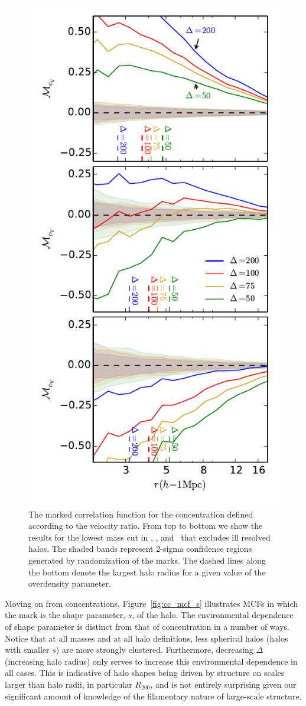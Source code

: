 \documentclass[usenatbib,usegraphicx,letterpaper]{mn2e}
\begin{document}
\begin{figure}
	\centering
	\includegraphics[width=.4\textwidth]{all_mcf_cV_z00_cutcomp.pdf}
	\caption{The marked correlation function for the concentration defined according to the velocity ratio. From top to bottom we show the results for the lowest mass cut in \simA, \simB, and \simC \ that excludes ill resolved halos. The shaded bands represent 2-sigma confidence regions generated by randomization of the marks. The dashed lines along the bottom denote the largest halo radius for a given value of the overdensity parameter. 
	}
	\label{fig:cc_mcf_cV}
\end{figure}

Moving on from concentrations, Figure~\ref{fig:cc_mcf_s} illustrates MCFs in which the mark is the shape parameter, $s$, of 
the halo. The environmental dependence of shape parameter is distinct from that of concentration in a number of ways. 
Notice that at all masses and at all halo definitions, less spherical halos (halos with smaller $s$) are more strongly 
clustered. Furthermore, decreasing $\Delta$ (increasing halo radius) only serves to increase this environmental 
dependence in all cases. This is indicative of halo shapes being driven by structure on scales larger than halo 
radii, in particular $R_{200}$, and is not entirely surprising given our significant amount of knowledge of the 
filamentary nature of large-scale structure. 
\end{document}
